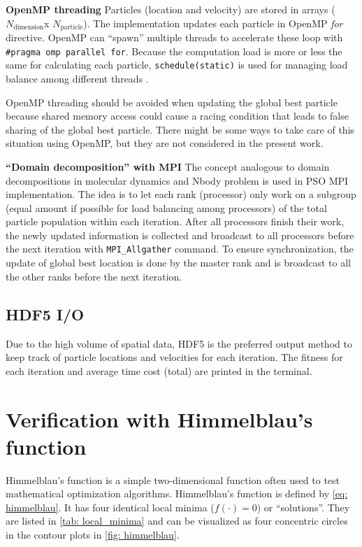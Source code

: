\documentclass[conference, 10pt]{IEEEtran}
\newcommand{\N}[1]{\ensuremath{N_\text{#1}}}
\newcommand{\Np}{\N{particle}}
\newcommand{\Ndim}{\N{dimension}}
\newcommand{\code}[1]{\texttt{\textcolor{BrickRed}{#1}}}
\begin{document}
\noindent\textbf{OpenMP threading}
Particles (location and velocity) are stored in arrays (\Ndim x \Np).
The implementation updates each particle in OpenMP \emph{for} directive.
OpenMP can ``spawn'' multiple threads to accelerate these loop with \code{\#pragma omp parallel for}.
Because the computation load is more or less the same for calculating each particle, \code{schedule(static)} is used for managing load balance among different threads \cite{eijkhout_2016, eijkhout_2016_2}.

OpenMP threading should be avoided when updating the global best particle because shared memory access could cause a racing condition that leads to false sharing of the global best particle.
There might be some ways to take care of this situation using OpenMP, but they are not considered in the present work. 
\medskip


\noindent\textbf{``Domain decomposition'' with MPI}
The concept analogous to domain decompositions in molecular dynamics and Nbody problem \cite{eijkhout_2016, Bindel_2010} is used in PSO MPI implementation.
The idea is to let each rank (processor) only work on a subgroup (equal amount if possible for load balancing among processors) of the total particle population within each iteration.
After all processors finish their work, the newly updated information is collected and broadcast to all processors before the next iteration with \code{MPI\_Allgather} command.
To ensure synchronization, the update of global best location is done by the master rank and is broadcast to all the other ranks before the next iteration.
\medskip


\subsection{HDF5 I/O}
Due to the high volume of spatial data, HDF5 is the preferred output method to keep track of particle locations and velocities for each iteration. 
The fitness for each iteration and average time cost (total) are printed in the terminal. 


\section{Verification with Himmelblau's function}

Himmelblau's function is a simple two-dimensional function often used to test mathematical optimization algorithms.
Himmelblau's function \cite{Himmelblau_1972} is defined by \cref{eq: himmelblau}.
It has four identical local minima ($f(\cdot)=0$) or ``solutions''.
They are listed in \cref{tab: local_minima} and can be visualized as four concentric circles in the contour plots in \cref{fig: himmelblau}. 
\end{document}
